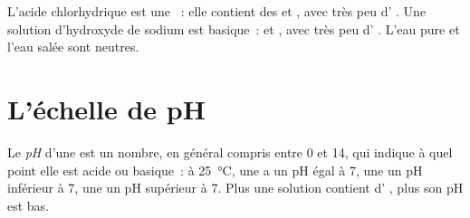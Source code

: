 \begin{example}\label{ex:g9:acids-bases-ph:three}
L'acide chlorhydrique est une ~: elle contient des 
 et , avec très peu d' . Une
solution d'hydroxyde de sodium est basique~:  et
, avec très peu d' . L'eau pure et l'eau salée
sont neutres.
\end{example}

\section{L'échelle de pH}

\begin{definition}[pH]\label{def:g9:acids-bases-ph:ph}
Le \emph{pH} d'une  est un nombre, en général
compris entre 0 et 14, qui indique à quel point elle est acide ou
basique~: à \qty{25}{\celsius}, une  a un pH égal à 7,
une  un pH inférieur à 7, une  un pH
supérieur à 7. Plus une solution contient d' , plus son pH
est bas.
\end{definition}


